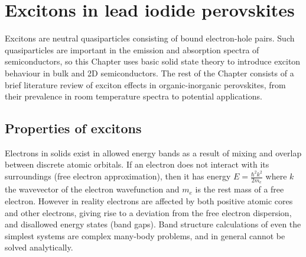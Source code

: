 
\chapter{Excitons in lead iodide perovskites}

\graphicspath{{Chapter2/Figures/}}

Excitons are neutral quasiparticles consisting of bound electron-hole pairs. Such quasiparticles are important in the emission and absorption spectra of semiconductors, so this Chapter uses basic solid state theory to introduce exciton behaviour in bulk and 2D semiconductors. The rest of the Chapter consists of a brief literature review of exciton effects in organic-inorganic perovskites, from their prevalence in room temperature spectra to potential applications.

\section{Properties of excitons}
Electrons in solids exist in allowed energy bands as a result of mixing and overlap between discrete atomic orbitals. If an electron does not interact with its surroundings (free electron approximation), then it has energy $E=\frac{\hbar^2k^2}{2m_e}$ where $k$ the wavevector of the electron wavefunction and $m_e$ is the rest mass of a free electron. However in reality electrons are affected by both positive atomic cores and other electrons, giving rise to a deviation from the free electron dispersion, and disallowed energy states (band gaps). Band structure calculations of even the simplest systems are complex many-body problems, and in general cannot be solved analytically.

